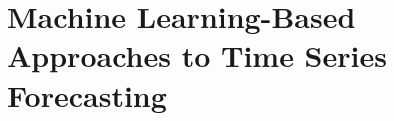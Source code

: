 \chapter{Machine Learning-Based Approaches to Time Series Forecasting\label{Machine Learning-Based Approaches to Time Series Forecasting}}